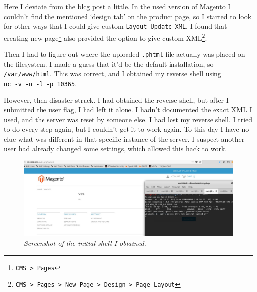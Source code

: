 Here I deviate from the blog post a little. In the used version of Magento I couldn't find the mentioned `design tab' on the product page, so I started to look for other ways that I could give custom \verb|Layout Update XML|. I found that creating new page\footnote{\verb|CMS > Pages|} also provided the option to give custom XML\footnote{\verb|CMS > Pages > New Page > Design > Page Layout|}.

Then I had to figure out where the uploaded \verb|.phtml| file actually was placed on the filesystem. I made a guess that it'd be the default installation, so \verb|/var/www/html|. This was correct, and I obtained my reverse shell using \\\verb|nc -v -n -l -p 10365|.

\vspace{5mm}

However, then disaster struck. I had obtained the reverse shell, but after I submitted the user flag, I had left it alone. I hadn't documented the exact XML I used, and the server was reset by someone else. I had lost my reverse shell. I tried to do every step again, but I couldn't get it to work again. To this day I have no clue what was different in that specific instance of the server. I suspect another user had already changed some settings, which allowed this hack to work.

\begin{figure}[H]
	\centering
	\captionsetup{justification=centering}
	\noindent \includegraphics[width=\textwidth]{figures/exploit-1.jpeg}
	\caption{\emph{Screenshot of the initial shell I obtained.}}
	\label{fig:exploit1}
\end{figure}
